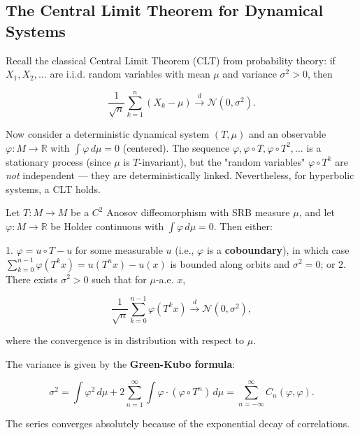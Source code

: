 \subsection{The Central Limit Theorem for Dynamical Systems}\label{sec:12.3.2}

Recall the classical Central Limit Theorem (CLT) from probability theory: if $X_1, X_2, \ldots$ are i.i.d. random variables with mean $\mu$ and variance $\sigma^2 > 0$, then

\[
\frac{1}{\sqrt{n}} \sum_{k=1}^{n} (X_k - \mu) \xrightarrow{d} \mathcal{N}(0, \sigma^2).
\]

Now consider a deterministic dynamical system $(T, \mu)$ and an observable $\varphi: M \to \mathbb{R}$ with $\int \varphi \, d\mu = 0$ (centered). The sequence $\varphi, \varphi \circ T, \varphi \circ T^2, \ldots$ is a stationary process (since $\mu$ is $T$-invariant), but the "random variables" $\varphi \circ T^k$ are \textit{not} independent --- they are deterministically linked. Nevertheless, for hyperbolic systems, a CLT holds.

\begin{theorem}\label{thm:12.12}
Let $T: M \to M$ be a $C^2$ Anosov diffeomorphism with SRB measure $\mu$, and let $\varphi: M \to \mathbb{R}$ be Holder continuous with $\int \varphi \, d\mu = 0$. Then either:

1. $\varphi = u \circ T - u$ for some measurable $u$ (i.e., $\varphi$ is a \textbf{coboundary}), in which case $\sum_{k=0}^{n-1} \varphi(T^k x) = u(T^n x) - u(x)$ is bounded along orbits and $\sigma^2 = 0$; or
2. There exists $\sigma^2 > 0$ such that for $\mu$-a.e. $x$,

\[
\frac{1}{\sqrt{n}} \sum_{k=0}^{n-1} \varphi(T^k x) \xrightarrow{d} \mathcal{N}(0, \sigma^2),
\]

where the convergence is in distribution with respect to $\mu$.

The variance is given by the \textbf{Green-Kubo formula}:

\[
\sigma^2 = \int \varphi^2 \, d\mu + 2 \sum_{n=1}^{\infty} \int \varphi \cdot (\varphi \circ T^n) \, d\mu = \sum_{n=-\infty}^{\infty} C_n(\varphi, \varphi).
\]

The series converges absolutely because of the exponential decay of correlations.
\end{theorem}


